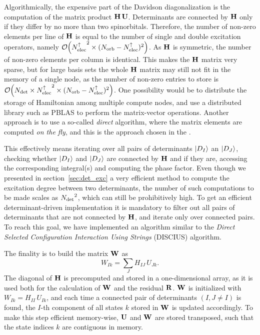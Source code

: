 \documentclass[./thesis.tex]{subfiles}
\begin{document}
Algorithmically, the expensive part of the Davidson diagonalization is the computation of the matrix product $\mathbf{H}\, \mathbf{U}$.
Determinants are connected by $\mathbf{H}$ only if they differ by no more than two
spinorbitals. Therefore, the number of non-zero elements per line of $\mathbf{H}$ is
equal to the number of single and double excitation operators, namely
$\order{\Nalpha^2 \times (\Norb - \Nalpha)^2}$. As $\mathbf{H}$ is symmetric, the number
of non-zero elements per column is identical. This makes the $\mathbf{H}$ matrix very
sparse, but for large basis sets the whole $\mathbf{H}$ matrix may still not fit in the
memory of a single node, as the number of non-zero entries to store is
$\order{\Ndet \times \Nalpha^2 \times (\Norb - \Nalpha)^2}$.  One possibility
would be to distribute the storage of Hamiltonian among multiple compute nodes,
and use a distributed library such as PBLAS\cite{pblas} to perform the
matrix-vector operations. Another approach is to use a so-called \emph{direct}
algorithm, where the matrix elements are computed \emph{on the fly}, and this
is the approach chosen in the \QP.


This effectively means iterating over all pairs of determinants ${\ket{D_I}}$ an
${\ket{D_J}}$, checking whether ${\ket{D_I}}$ and ${\ket{D_J}}$ are connected by $\mathbf{H}$ and if they are,
accessing the corresponding integral(s) and computing the phase factor. Even
though we presented in section~\ref{sec:det_exc} a very efficient method to
compute the excitation degree
between two determinants, the number of such computations to be made scales as
${N_\text{det}}^2$, which can still be prohibitively high. To get an efficient
determinant-driven implementation it is mandatory to filter out all pairs of
determinants that are not connected by $\mathbf{H}$, and iterate only over connected
pairs. To reach this goal, we have implemented an algorithm similar to the
\emph{Direct Selected Configuration Interaction Using Strings} (DISCIUS)
algorithm.\cite{Povill_1995}

The finality is to build the matrix $\mathbf{W}$ as
\begin{equation}
W_{Ik} = \sum_J H_{IJ}\, U_{Jk}.
\label{eq:whu}
\end{equation}
The diagonal of $\mathbf{H}$ is precomputed and stored in a one-dimensional array, as it is
used both for the calculation of $\mathbf{W}$ and the residual $\mathbf{R}$.
$\mathbf{W}$ is initialized with $W_{Ik} = H_{II}\, U_{Ik}$, and
each time a connected pair of determinants $(I, J \neq I)$ is found, the $I$-th component of all states $k$ stored in $\mathbf{W}$ is updated accordingly. To make this step efficient memory-wise, $\mathbf{U}$ and $\mathbf{W}$ are stored transposed, such that the state indices $k$ are contiguous in memory.
\end{document}
